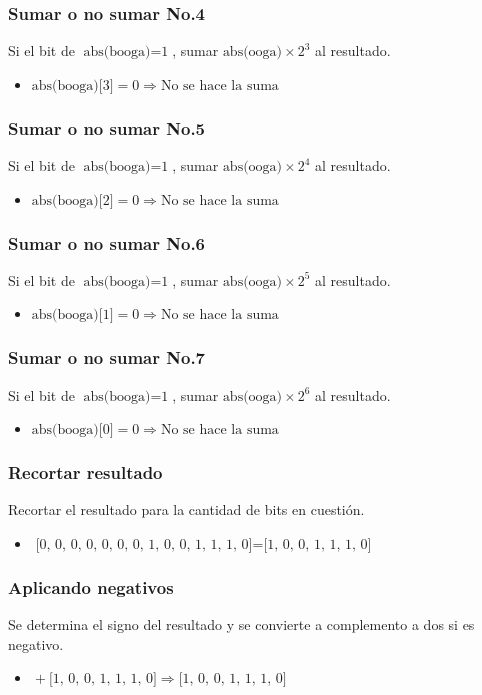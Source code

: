 \documentclass{beamer}
\begin{document}
\begin{frame}
\frametitle{Sumar o no sumar No.4}
Si el bit de $\text{abs(booga)}=\text{1}$, sumar $\text{abs(ooga)}\times\text{2}^{\text{3}}$ al resultado.
\begin{itemize}
\item $\text{abs(booga)[3]}=\text{0}\Longrightarrow\text{No se hace la suma}$
\end{itemize}
\end{frame}
\begin{frame}
\frametitle{Sumar o no sumar No.5}
Si el bit de $\text{abs(booga)}=\text{1}$, sumar $\text{abs(ooga)}\times\text{2}^{\text{4}}$ al resultado.
\begin{itemize}
\item $\text{abs(booga)[2]}=\text{0}\Longrightarrow\text{No se hace la suma}$
\end{itemize}
\end{frame}
\begin{frame}
\frametitle{Sumar o no sumar No.6}
Si el bit de $\text{abs(booga)}=\text{1}$, sumar $\text{abs(ooga)}\times\text{2}^{\text{5}}$ al resultado.
\begin{itemize}
\item $\text{abs(booga)[1]}=\text{0}\Longrightarrow\text{No se hace la suma}$
\end{itemize}
\end{frame}
\begin{frame}
\frametitle{Sumar o no sumar No.7}
Si el bit de $\text{abs(booga)}=\text{1}$, sumar $\text{abs(ooga)}\times\text{2}^{\text{6}}$ al resultado.
\begin{itemize}
\item $\text{abs(booga)[0]}=\text{0}\Longrightarrow\text{No se hace la suma}$
\end{itemize}
\end{frame}
\begin{frame}
\frametitle{Recortar resultado}
Recortar el resultado para la cantidad de bits en cuestión.
\begin{itemize}
\item $\text{[0, 0, 0, 0, 0, 0, 0, 1, 0, 0, 1, 1, 1, 0]}=\text{[1, 0, 0, 1, 1, 1, 0]}$
\end{itemize}
\end{frame}
\begin{frame}
\frametitle{Aplicando negativos}
Se determina el signo del resultado y se convierte a complemento a dos si es negativo.
\begin{itemize}
\item $\text{}+\text{[1, 0, 0, 1, 1, 1, 0]}\Longrightarrow\text{[1, 0, 0, 1, 1, 1, 0]}$
\end{itemize}
\end{frame}
\end{document}
